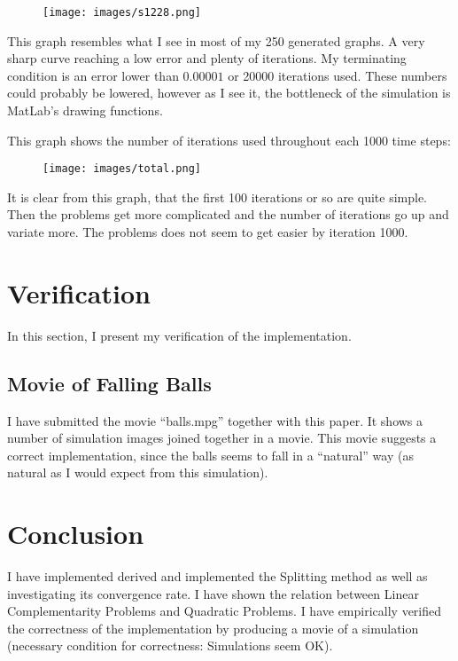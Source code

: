 \documentclass[10pt,oneside,a4paper,final,english]{memoir}
\begin{document}
\begin{figure}[H]
\texttt{[image: images/s1228.png]}
\end{figure}
This graph resembles what I see in most of my 250 generated graphs. A
very sharp curve reaching a low error and plenty of iterations. My
terminating condition is an error lower than $0.00001$ or 20000
iterations used. These numbers could probably be lowered, however as I
see it, the bottleneck of the simulation is MatLab's drawing
functions.


This graph shows the number of iterations used throughout each 1000
time steps:
\begin{figure}[H]
\texttt{[image: images/total.png]}
\end{figure}
It is clear from this graph, that the first 100 iterations or so are
quite simple. Then the problems get more complicated and the number of
iterations go up and variate more. The problems does not seem to get
easier by iteration 1000.


\section{Verification}
In this section, I present my verification of the implementation.


\subsection{Movie of Falling Balls}
I have submitted the movie ``balls.mpg'' together with this paper. It
shows a number of simulation images joined together in a movie. This
movie suggests a correct implementation, since the balls seems to fall
in a ``natural'' way (as natural as I would expect from this
simulation).





\section{Conclusion}
I have implemented derived and implemented the Splitting method as
well as investigating its convergence rate. I have shown the relation
between Linear Complementarity Problems and Quadratic Problems. I have
empirically verified the correctness of the implementation by
producing a movie of a simulation (necessary condition for
correctness: Simulations seem OK).
\end{document}
